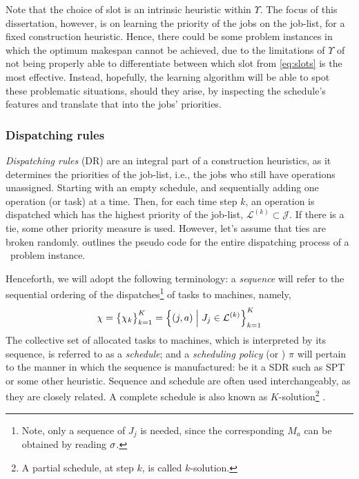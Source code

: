 Note that the choice of slot is an intrinsic heuristic within $\Upsilon$.
The focus of this dissertation, however, is on learning the priority of the 
jobs on the job-list, for a fixed construction heuristic. 
Hence, there could be some problem instances in which the optimum makespan 
cannot be achieved, due to the limitations of $\Upsilon$ of not being properly 
able to differentiate between which slot from \cref{eq:slots} is the most 
effective.
Instead, hopefully, the learning algorithm will be able to spot these 
problematic situations, should they arise, by inspecting the schedule's 
features and translate that into the jobs' priorities.

\subsubsection*{Dispatching rules}

\emph{Dispatching rules} (DR) are an integral part of a construction 
heuristics, as it determines the priorities of the job-list, i.e., 
the jobs who still have operations unassigned. 
Starting with an empty schedule, and sequentially adding one operation (or 
task) at a time. Then, for each time step $k$, an operation is dispatched which 
has the highest priority of the 
job-list, \mbox{$\mathcal{L}^{(k)}\subset\mathcal{J}$}.
If there is a tie, some other priority measure is used. 
However, let's assume that ties are broken randomly. 
 outlines the pseudo code for the entire dispatching 
process of a \JSP\ problem instance.

\clearpage


Henceforth, we will adopt the following terminology: a \emph{sequence} will 
refer to the sequential ordering of the dispatches\footnote{Note, 
    only a sequence of $J_j$ is needed, since the corresponding $M_a$ can be 
    obtained by reading ${\mathbf{\sigma}}$.} 
of tasks to machines, namely, 
\begin{equation} \label{eq:vchi}
\vchi = \big\{\chi_k\big\}_{k=1}^K
= \condset{(j,a)}{J_j\in\mathcal{L}^{(k)}}_{k=1}^K
\end{equation}
The collective set of allocated tasks to machines, which is interpreted by its 
sequence, is referred to as a \emph{schedule};
and a \emph{scheduling policy} (or \dr) $\pi$ will pertain to the manner in 
which the sequence is manufactured: be it a 
SDR such as SPT or some other heuristic. 
Sequence and schedule are often used interchangeably, as they are closely 
related. A complete schedule is also known as $K$-solution\footnote{A partial 
    schedule, at step $k$, is called $k$-solution.} \citep{Bertsekas97}.

